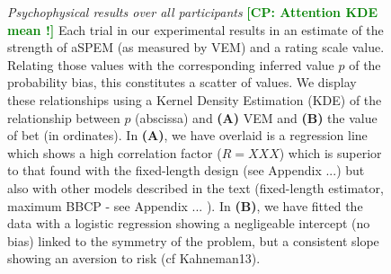 \documentclass[12pt,english]{article}%
\newcommand{\CP}[1]{\textbf{\textcolor{green}{[CP: #1]}}}
\begin{document}
\begin{figure}
\caption{ \emph{Psychophysical results over all participants}
\CP{Attention KDE mean !}
Each trial in our experimental results in an estimate of
the strength of aSPEM (as measured by VEM)
and a rating scale value.
Relating those values with the corresponding inferred value $\hat{p}$
of the probability bias,
this constitutes a scatter of values.
We display these relationships using a
Kernel Density Estimation (KDE) of the relationship between $p$ (abscissa)
and \textbf{(A)} VEM and \textbf{(B)} the value of bet (in ordinates).
In \textbf{(A)}, we have overlaid is a regression line which shows
a high correlation factor ($R=XXX$) which is superior to that found
with the fixed-length design (see Appendix ...)
but also with other models described in the text
(fixed-length estimator, maximum BBCP - see Appendix ... ).
In \textbf{(B)}, we have fitted the data with a logistic regression
showing a negligeable intercept (no bias) linked to the symmetry
of the problem, but a consistent slope showing an aversion to risk
(cf Kahneman13).
}

\label{fig:results_psycho}
\end{figure}
\end{document}
